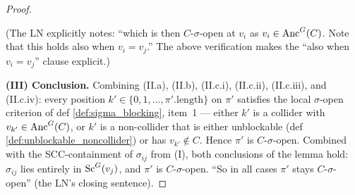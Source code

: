 \begin{Lem}[LabelRoman]
\begin{proof}
\begin{itemize}
        (The LN explicitly notes: ``which is then $C$-$\sigma$-open at $v_i$ as $v_i \in \mathrm{Anc}^G(C)$. Note that this holds also when $v_i = v_j$.'' The above verification makes the ``also when $v_i = v_j$'' clause explicit.)
\end{itemize}

\medskip\noindent\textbf{(III) Conclusion.}
Combining (II.a), (II.b), (II.c.i), (II.c.ii), (II.c.iii), and (II.c.iv): every position $k' \in \{0, 1, \dots, \pi'.\text{length}\}$ on $\pi'$ satisfies the local $\sigma$-open criterion of def \ref{def:sigma_blocking}, item~1 — either $k'$ is a collider with $v_{k'} \in \mathrm{Anc}^G(C)$, or $k'$ is a non-collider that is either unblockable (def \ref{def:unblockable_noncollider}) or has $v_{k'} \notin C$. Hence $\pi'$ is $C$-$\sigma$-open. Combined with the SCC-containment of $\sigma_{ij}$ from (I), both conclusions of the lemma hold: $\sigma_{ij}$ lies entirely in $\mathrm{Sc}^G(v_j)$, and $\pi'$ is $C$-$\sigma$-open. ``So in all cases $\pi'$ stays $C$-$\sigma$-open'' (the LN's closing sentence).
\end{proof}
\end{Lem}


